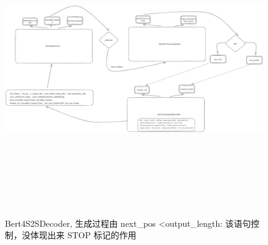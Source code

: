 \documentclass[a4paper]{article}
\begin{document}
\begin{sloppypar}
      \begin{figure}[H]
            \centering
            \includegraphics[width=6.5in,height=5.0in]{Bert4S2SDecoder.png}

            \caption{Bert4S2SDecoder, 生成过程由 next\_pos \textless output\_length: 该语句控制，没体现出来 STOP 标记的作用}

            \label{Bert4S2SDecoder}
      \end{figure}








\end{sloppypar}
\end{document}
